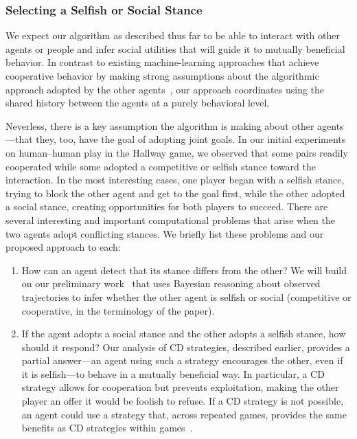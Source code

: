 
\subsubsection*{\large Selecting a Selfish or Social Stance}
\label{sec:stance}

We expect our algorithm as described thus far to be able to interact
with other agents or people and infer social utilities that will guide
it to mutually beneficial behavior. In contrast to existing
machine-learning approaches that achieve cooperative behavior by
making strong assumptions about the algorithmic approach adopted by
the other agents~\cite{conitzer07}, our approach coordinates using the
shared history between the agents at a purely behavioral level.

Neverless, there is a key assumption the algorithm is making about
other agents---that they, too, have the goal of adopting joint
goals. In our initial experiments on human--human play in the Hallway
game, we observed that some pairs readily cooperated while some
adopted a competitive or selfish stance toward the interaction. In the
most interesting cases, one player began with a selfish stance, trying
to block the other agent and get to the goal first, while the other
adopted a social stance, creating opportunities for both players to
succeed. There are several interesting and important computational
problems that arise when the two agents adopt conflicting stances. We
briefly list these problems and our proposed approach to each:

\begin{enumerate}

\item How can an agent detect that its stance differs from the other?
  We will build on our preliminary work~\cite{kleiman16} that uses
  Bayesian reasoning about observed trajectories to infer whether the
  other agent is selfish or social (competitive or cooperative, in the
  terminology of the paper).
  
\item If the agent adopts a social stance and the other adopts a
  selfish stance, how should it respond? Our analysis of CD
  strategies, described earlier, provides a partial answer---an agent
  using such a strategy encourages the other, even if it is
  selfish---to behave in a mutually beneficial way. In particular, a
  CD strategy allows for cooperation but prevents exploitation, making
  the other player an offer it would be foolish to refuse. If a CD
  strategy is not possible, an agent could use a strategy that, across
  repeated games, provides the same benefits as CD strategies within
  games~\cite{munoz08}.
  
\end{enumerate}
